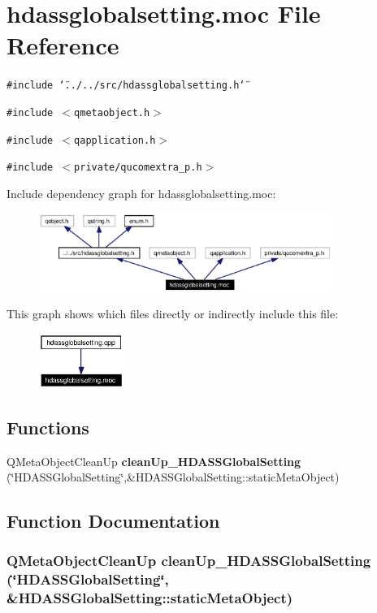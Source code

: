 \section{hdassglobalsetting.moc File Reference}
\label{hdassglobalsetting_8moc}


{\tt \#include \char`\"{}../../src/hdassglobalsetting.h\char`\"{}}\par
{\tt \#include $<$qmetaobject.h$>$}\par
{\tt \#include $<$qapplication.h$>$}\par
{\tt \#include $<$private/qucomextra\_\-p.h$>$}\par


Include dependency graph for hdassglobalsetting.moc:\begin{figure}[H]
\begin{center}
\leavevmode
\includegraphics[width=270pt]{hdassglobalsetting_8moc__incl}
\end{center}
\end{figure}


This graph shows which files directly or indirectly include this file:\begin{figure}[H]
\begin{center}
\leavevmode
\includegraphics[width=78pt]{hdassglobalsetting_8moc__dep__incl}
\end{center}
\end{figure}
\subsection*{Functions}
\begin{CompactItemize}
\item 
QMeta\-Object\-Clean\-Up {\bf clean\-Up\_\-HDASSGlobal\-Setting} (\char`\"{}HDASSGlobal\-Setting\char`\"{},\&HDASSGlobal\-Setting::static\-Meta\-Object)
\end{CompactItemize}


\subsection{Function Documentation}
\subsubsection{\setlength{\rightskip}{0pt plus 5cm}QMeta\-Object\-Clean\-Up clean\-Up\_\-HDASSGlobal\-Setting (\char`\"{}HDASSGlobal\-Setting\char`\"{}, \&HDASSGlobal\-Setting::static\-Meta\-Object)\hspace{0.3cm}{\tt  [static]}}\label{hdassglobalsetting_8moc_a0}


